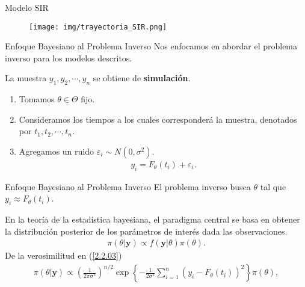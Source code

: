 \documentclass[10pt,aspectratio=169]{beamer}
\begin{document}
\begin{frame}{Modelo SIR}
  \begin{figure}
    \centering
    \texttt{[image: img/trayectoria\_SIR.png]}
    \label{fig:trayectoria_SIR}
  \end{figure}
\end{frame}

\begin{frame}{Enfoque Bayesiano al Problema Inverso}
  Nos enfocamos en abordar el problema inverso para los modelos descritos.

  La muestra $y_1, y_2, \cdots, y_n$ se obtiene de \textbf{simulación}. 
  \begin{enumerate}
    \item 
    Tomamos $\theta \in \Theta$ fijo.
    \item
    Consideramos los tiempos a los cuales corresponderá la muestra, denotados por $t_1, t_2, \cdots, t_n$. 
    \item
    Agregamos un ruido $\varepsilon_i \sim N(0,\sigma^2)$.
    \begin{align}
      y_i = F_{\theta}(t_i) + \varepsilon_i.
      \label{3.2.01}
    \end{align}
  \end{enumerate}
  
\end{frame}


\begin{frame}{Enfoque Bayesiano al Problema Inverso}
  El problema inverso busca $\theta$ tal que $y_i \approx F_{\theta}(t_i)$.

  \vspace{0.5 cm}

  En la teoría de la estadística bayesiana, el paradigma central se basa en obtener la distribución posterior de los parámetros de interés dada las observaciones.
  \begin{align}
    \pi(\theta|\mathbf{y}) \propto f(\mathbf{y}|\theta) \pi(\theta).
    \label{3.2.1.01}
  \end{align}
  De la verosimilitud en (\ref{2.2.03})
  \begin{align}
    \pi(\theta|\mathbf{y}) \propto \left(\frac{1}{2\pi \sigma^2}\right) ^{n/2}\exp \left \{  -\frac{1}{2\sigma^2}\sum_{i = 1}^{n} \left(y_i - F_{\theta}(t_i)\right)^2 \right \} \pi(\theta),
    \label{3.2.1.02}
  \end{align}
\end{frame}
\end{document}
